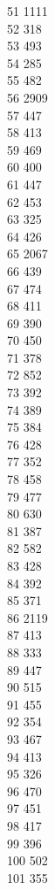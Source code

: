 { 51	1111 \\
 52	318 \\
 53	493 \\
 54	285 \\
 55	482 \\
 56	2909 \\
 57	447 \\
 58	413 \\
 59	469 \\
 60	400 \\
 61	447 \\
 62	453 \\
 63	325 \\
 64	426 \\
 65	2067 \\
 66	439 \\
 67	474 \\
 68	411 \\
 69	390 \\
 70	450 \\
 71	378 \\
 72	852 \\
 73	392 \\
 74	389 \\
 75	384 \\
 76	428 \\
 77	352 \\
 78	458 \\
 79	477 \\
 80	630 \\
 81	387 \\
 82	582 \\
 83	428 \\
 84	392 \\
 85	371 \\
 86	2119 \\
 87	413 \\
 88	333 \\
 89	447 \\
 90	515 \\
 91	455 \\
 92	354 \\
 93	467 \\
 94	413 \\
 95	326 \\
 96	470 \\
 97	451 \\
 98	417 \\
 99	396 \\
 100	502 \\
 101	355 \\
}
